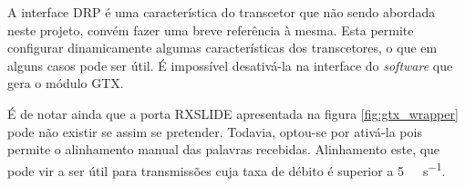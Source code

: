 A interface DRP é uma característica do transcetor que não sendo abordada neste projeto, convém fazer uma breve referência à mesma. Esta permite configurar dinamicamente algumas características dos transcetores, o que em alguns casos pode ser útil. É impossível desativá-la na interface do \textit{software} que gera o módulo GTX.

É de notar ainda que a porta RXSLIDE apresentada na figura \ref{fig:gtx_wrapper} pode não existir se assim se pretender. Todavia, optou-se por ativá-la pois permite o alinhamento manual das palavras recebidas. Alinhamento este, que pode vir a ser útil para transmissões cuja taxa de débito é superior a \SI{5}{\giga\bit\per\second}.







%
%
%
%
%
%
%









